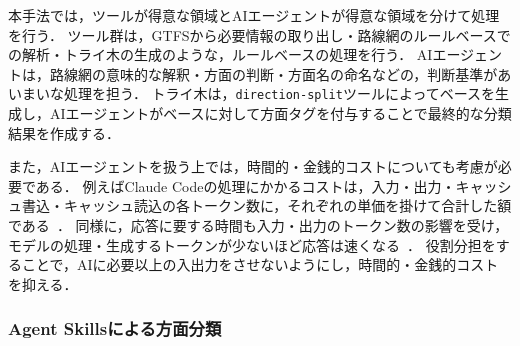 本手法では，ツールが得意な領域とAIエージェントが得意な領域を分けて処理を行う．
ツール群は，GTFSから必要情報の取り出し・路線網のルールベースでの解析・トライ木の生成のような，ルールベースの処理を行う．
AIエージェントは，路線網の意味的な解釈・方面の判断・方面名の命名などの，判断基準があいまいな処理を担う．
トライ木は，\texttt{direction-split}ツールによってベースを生成し，AIエージェントがベースに対して方面タグを付与することで最終的な分類結果を作成する．

また，AIエージェントを扱う上では，時間的・金銭的コストについても考慮が必要である．
例えばClaude Codeの処理にかかるコストは，入力・出力・キャッシュ書込・キャッシュ読込の各トークン数に，それぞれの単価を掛けて合計した額である~\cite{AnthropicPricing}．
同様に，応答に要する時間も入力・出力のトークン数の影響を受け，モデルの処理・生成するトークンが少ないほど応答は速くなる~\cite{AnthropicReduceLatency}．
役割分担をすることで，AIに必要以上の入出力をさせないようにし，時間的・金銭的コストを抑える．

\subsubsection{Agent Skillsによる方面分類}

